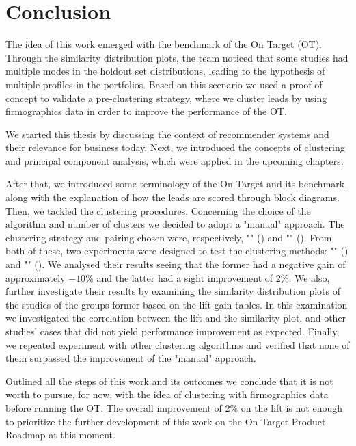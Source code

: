 \chapter{Conclusion} 
\label{cha:conclusion}

The idea of this work emerged with the benchmark of the On Target (OT). Through the similarity distribution plots, the team noticed that some studies had multiple modes in the holdout set distributions, leading to the hypothesis of multiple profiles in the portfolios. Based on this scenario we used a proof of concept to validate a pre-clustering strategy, where we cluster leads by using firmographics data in order to improve the performance of the OT.

We started this thesis by discussing the context of recommender systems and their relevance for business today. Next, we introduced the concepts of clustering and principal component analysis, which were applied in the upcoming chapters.

After that, we introduced some terminology of the On Target and its benchmark, along with the explanation of how the leads are scored through block diagrams. Then, we tackled the clustering procedures. Concerning the choice of the algorithm and number of clusters we decided to adopt a "manual" approach. The clustering strategy and pairing chosen were, respectively, "\fullNameClusterStrategyA{}" (\nameClusterStrategyA{}) and "\fullNameClusterPairingA{}" (\nameClusterPairingA{}). From both of these, two experiments were designed to test the clustering methods: "\fullNameExperimentI{}" (\nameExperimentI{}) and "\fullNameExperimentII{}" (\nameExperimentII{}).
We analysed their results seeing that the former had a negative gain of approximately $-10\%$ and the latter had a sight improvement of $2\%$. We also, further investigate their results by examining the similarity distribution plots of the studies of the groups former based on the lift gain tables. In this examination we investigated the correlation between the lift and the similarity plot, and other studies' cases that did not yield performance improvement as expected. Finally, we repeated experiment \nameExperimentII{} with other clustering algorithms and verified that none of them surpassed the improvement of the "manual" approach.

Outlined all the steps of this work and its outcomes we conclude that it is not worth to pursue, for now, with the idea of clustering with firmographics data before running the OT. The overall improvement of $2\%$ on the lift is not enough to prioritize the further development of this work on the On Target Product Roadmap at this moment.

